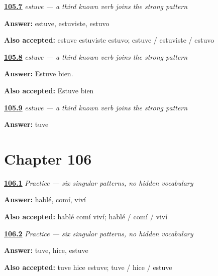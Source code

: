 \noindent\begin{minipage}[t]{\linewidth}
\raggedright
\hyperlink{review-ES-C15-preterite-fuertes-estar-forms}{\textbf{105.7}} \emph{estuve — a third known verb joins the strong pattern}\par
\small \textbf{Answer:} estuve, estuviste, estuvo\par
\footnotesize \textbf{Also accepted:} estuve estuviste estuvo; estuve / estuviste / estuvo
\end{minipage}\par\medskip

\noindent\begin{minipage}[t]{\linewidth}
\raggedright
\hyperlink{review-ES-C15-preterite-fuertes-estuve-bien}{\textbf{105.8}} \emph{estuve — a third known verb joins the strong pattern}\par
\small \textbf{Answer:} Estuve bien.\par
\footnotesize \textbf{Also accepted:} Estuve bien
\end{minipage}\par\medskip

\noindent\begin{minipage}[t]{\linewidth}
\raggedright
\hyperlink{review-ES-C15-preterite-fuertes-analogy}{\textbf{105.9}} \emph{estuve — a third known verb joins the strong pattern}\par
\small \textbf{Answer:} tuve\par
\end{minipage}\par\medskip

\section*{Chapter 106}

\noindent\begin{minipage}[t]{\linewidth}
\raggedright
\hyperlink{review-ES-C15-practice-regular-yo-forms}{\textbf{106.1}} \emph{Practice — six singular patterns, no hidden vocabulary}\par
\small \textbf{Answer:} hablé, comí, viví\par
\footnotesize \textbf{Also accepted:} hablé comí viví; hablé / comí / viví
\end{minipage}\par\medskip

\noindent\begin{minipage}[t]{\linewidth}
\raggedright
\hyperlink{review-ES-C15-practice-strong-yo-forms}{\textbf{106.2}} \emph{Practice — six singular patterns, no hidden vocabulary}\par
\small \textbf{Answer:} tuve, hice, estuve\par
\footnotesize \textbf{Also accepted:} tuve hice estuve; tuve / hice / estuve
\end{minipage}\par\medskip

